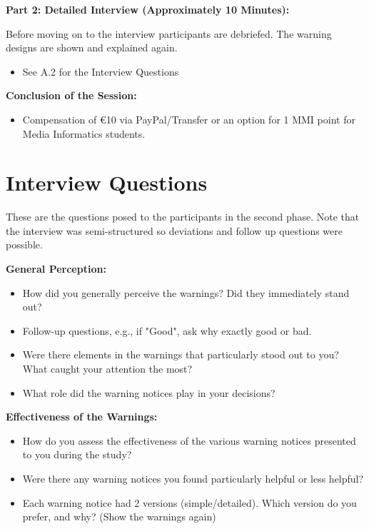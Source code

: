 \documentclass[
  a4paper,  %
  twoside,  %
  bibliography=totoc,
  headsepline,
  cleardoublepage=empty,
  parskip=half,
  draft=false
]{scrbook}
\begin{document}
\textbf{Part 2: Detailed Interview (Approximately 10 Minutes):}

Before moving on to the interview participants are debriefed. The warning designs are shown and explained again.
\begin{itemize}
    \item See A.2 for the Interview Questions
\end{itemize}

\textbf{Conclusion of the Session:}
\begin{itemize}
    \item Compensation of €10 via PayPal/Transfer or an option for 1 MMI point for Media Informatics students.
\end{itemize}

\section{Interview Questions}
\label{sec:interview}
These are the questions posed to the participants in the second phase. Note that the interview was semi-structured so deviations and follow up questions were possible.

\textbf{General Perception:}

\begin{itemize}
    \item How did you generally perceive the warnings? Did they immediately stand out?
    \item Follow-up questions, e.g., if "Good", ask why exactly good or bad.
    \item Were there elements in the warnings that particularly stood out to you? What caught your attention the most?
    \item What role did the warning notices play in your decisions?
\end{itemize}

\textbf{Effectiveness of the Warnings:
}
    \begin{itemize}
        \item How do you assess the effectiveness of the various warning notices presented to you during the study?
        \item Were there any warning notices you found particularly helpful or less helpful?
        \item Each warning notice had 2 versions (simple/detailed). Which version do you prefer, and why? (Show the warnings again)
    \end{itemize}
\end{document}
